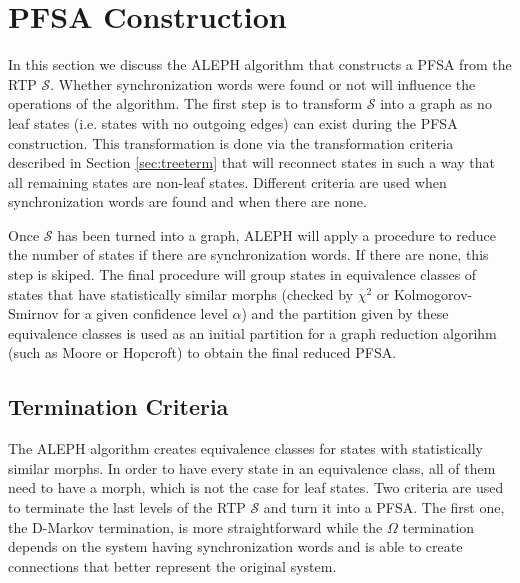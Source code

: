 {\section{PFSA Construction \label{sec:pfsacons}}

In this section we discuss the ALEPH algorithm that constructs a PFSA from the RTP $\mathcal{S}$. Whether synchronization words were found or not will influence the operations of the algorithm. The first step is to transform $\mathcal{S}$ into a graph as no leaf states (i.e. states with no outgoing edges) can exist during the PFSA construction. This transformation is done via the transformation criteria described in Section \ref{sec:treeterm} that will reconnect states in such a way that all remaining states are non-leaf states. Different criteria are used when synchronization words are found and when there are none.

Once $\mathcal{S}$ has been turned into a graph, ALEPH will apply a procedure to reduce the number of states if there are synchronization words. If there are none, this step is skiped. The final procedure will group states in equivalence classes of states that have statistically similar morphs (checked by $\chi^2$ or Kolmogorov-Smirnov for a given confidence level $\alpha$) and the partition given by these equivalence classes is used as an initial partition for a graph reduction algorihm (such as Moore or Hopcroft) to obtain the final reduced PFSA.

\subsection{Termination Criteria\label{sec:treeterm}}

The ALEPH algorithm creates equivalence classes for states with statistically similar morphs. In order to have every state in an equivalence class, all of them need to have a morph, which is not the case for leaf states. Two criteria are used to terminate the last levels of the RTP $\mathcal{S}$ and turn it into a PFSA. The first one, the D-Markov termination, is more straightforward while the $\Omega$ termination depends on the system having synchronization words and is able to create connections that better represent the original system.

}
